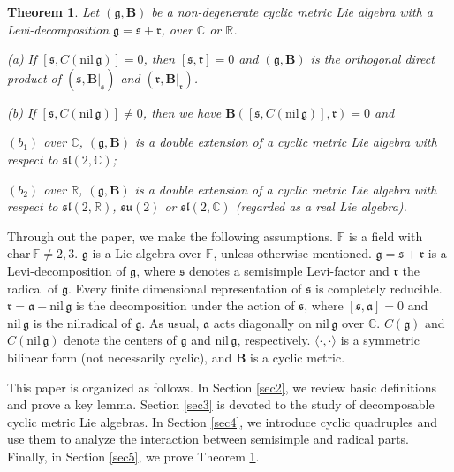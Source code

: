 \documentclass[reqno]{amsart}
\newtheorem{thm}{Theorem}[section]
\theoremstyle{definition}
\begin{document}
\begin{thm}\label{1-thm-main3}
Let $(\mathfrak{g},\mathbf{B})$ be a non-degenerate cyclic metric Lie algebra  with   a Levi-decomposition $\mathfrak{g}=\mathfrak{s}+\mathfrak{r}$, over $\mathbb{C}$ or $\mathbb{R}$.

(a) If $[\mathfrak{s},C(\mathrm{nil}\,\mathfrak{g})]=0$, then $[\mathfrak{s},\mathfrak{r}]=0$ and $(\mathfrak{g},\mathbf{B})$ is the orthogonal direct product of $(\mathfrak{s},\mathbf{B}|_{\mathfrak{s}})$
 and  $(\mathfrak{r},\mathbf{B}|_{\mathfrak{r}})$.

(b) If $[\mathfrak{s},C(\mathrm{nil}\,\mathfrak{g})]\neq0$, then we have $\mathbf{B}([\mathfrak{s},C(\mathrm{nil}\,\mathfrak{g})],\mathfrak{r})=0$ and

$(b_1)$ over $\mathbb{C}$, $(\mathfrak{g},\mathbf{B})$  is a double extension of a  cyclic metric  Lie algebra with respect to $\mathfrak{sl}(2,\mathbb{C})$;

$(b_2)$ over $\mathbb{R}$, $(\mathfrak{g},\mathbf{B})$  is a double extension of a  cyclic metric  Lie algebra with respect to $\mathfrak{sl}(2,\mathbb{R})$, $\mathfrak{su}(2)$ or $\mathfrak{sl}(2,\mathbb{C})$ (regarded as a real Lie algebra).
\end{thm}

Through out the paper, we make the following assumptions.
$\mathbb{F}$ is a field with $\mathrm{char}\, \mathbb{F}\neq 2,3$.
$\mathfrak{g}$ is a Lie algebra over $\mathbb{F}$, unless otherwise mentioned.
$\mathfrak{g}=\mathfrak{s}+\mathfrak{r}$ is  a Levi-decomposition of $\mathfrak{g}$,
where $\mathfrak{s}$ denotes a semisimple Levi-factor and $\mathfrak{r}$  the radical of $\mathfrak{g}$. Every finite dimensional representation of $\mathfrak{s}$ is completely reducible.
$\mathfrak{r}=\mathfrak{a}+\mathrm{nil}\,\mathfrak{g}$ is the decomposition under the action of $\mathfrak{s}$,
where $[\mathfrak{s},\mathfrak{a}]=0$ and $\mathrm{nil}\,\mathfrak{g}$ is the nilradical of $\mathfrak{g}$.
As usual,  $\mathfrak{a}$ acts   diagonally on $\mathrm{nil}\,\mathfrak{g}$ over $\mathbb{C}$.
$C(\mathfrak{g})$ and $C(\mathrm{nil}\,\mathfrak{g})$ denote the centers of $\mathfrak{g}$ and $\mathrm{nil}\,\mathfrak{g}$, respectively.
$\langle\cdot,\cdot\rangle$ is a symmetric bilinear form (not necessarily cyclic),
and $\mathbf{B}$ is a cyclic metric.

This paper is organized as follows. In Section \ref{sec2}, we review basic definitions and prove a key lemma. Section \ref{sec3} is devoted to the study of decomposable cyclic metric Lie algebras. In Section \ref{sec4}, we introduce cyclic quadruples and use them to analyze the interaction between semisimple and radical parts. Finally, in Section \ref{sec5}, we prove Theorem \ref{1-thm-main3}.
\end{document}
